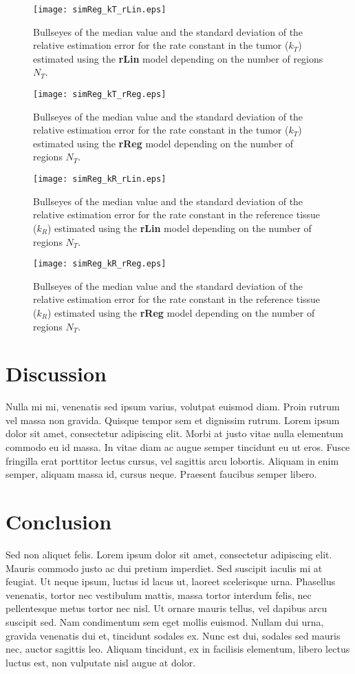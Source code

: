 \begin{figure}
\texttt{[image: simReg\_kT\_rLin.eps]}
\caption{Bullseyes of the median value and the standard deviation of the relative estimation error for the rate constant in the tumor ($k_T$) estimated using the \textbf{rLin} model depending on the number of regions $N_T$.}
\label{fig:region_kT_rLin}
\end{figure}

\begin{figure}
\texttt{[image: simReg\_kT\_rReg.eps]}
\caption{Bullseyes of the median value and the standard deviation of the relative estimation error for the rate constant in the tumor ($k_T$) estimated using the \textbf{rReg} model depending on the number of regions $N_T$.}
\label{fig:region_kT_rReg}
\end{figure}

\begin{figure}
\texttt{[image: simReg\_kR\_rLin.eps]}
\caption{Bullseyes of the median value and the standard deviation of the relative estimation error for the rate constant in the reference tissue ($k_R$) estimated using the \textbf{rLin} model depending on the number of regions $N_T$.}
\label{fig:region_kR_rLin}
\end{figure}

\begin{figure}
\texttt{[image: simReg\_kR\_rReg.eps]}
\caption{Bullseyes of the median value and the standard deviation of the relative estimation error for the rate constant in the reference tissue ($k_R$) estimated using the \textbf{rReg} model depending on the number of regions $N_T$.}
\label{fig:region_kR_rReg}
\end{figure}


\section{Discussion}
Nulla mi mi, venenatis sed ipsum varius, volutpat euismod diam. Proin rutrum vel massa non gravida. Quisque tempor sem et dignissim rutrum. Lorem ipsum dolor sit amet, consectetur adipiscing elit. Morbi at justo vitae nulla elementum commodo eu id massa. In vitae diam ac augue semper tincidunt eu ut eros. Fusce fringilla erat porttitor lectus cursus, vel sagittis arcu lobortis. Aliquam in enim semper, aliquam massa id, cursus neque. Praesent faucibus semper libero.

\section{Conclusion}
Sed non aliquet felis. Lorem ipsum dolor sit amet, consectetur adipiscing elit. Mauris commodo justo ac dui pretium imperdiet. Sed suscipit iaculis mi at feugiat. Ut neque ipsum, luctus id lacus ut, laoreet scelerisque urna. Phasellus venenatis, tortor nec vestibulum mattis, massa tortor interdum felis, nec pellentesque metus tortor nec nisl. Ut ornare mauris tellus, vel dapibus arcu suscipit sed. Nam condimentum sem eget mollis euismod. Nullam dui urna, gravida venenatis dui et, tincidunt sodales ex. Nunc est dui, sodales sed mauris nec, auctor sagittis leo. Aliquam tincidunt, ex in facilisis elementum, libero lectus luctus est, non vulputate nisl augue at dolor.